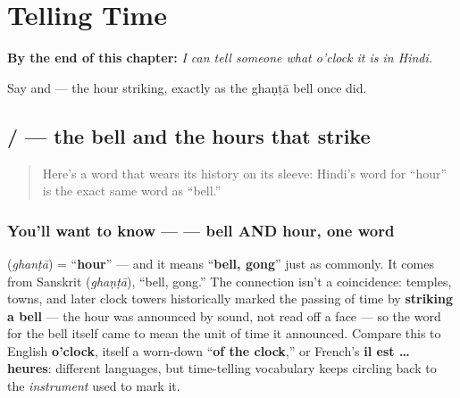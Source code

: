 
\chapter{Telling Time}
\label{ch:hi-telling-time}

\begin{chapteropening}
\textbf{By the end of this chapter:} \emph{I can tell someone what o'clock it is in Hindi.}

Say     and     — the hour striking, exactly as the ghaṇṭā bell once did.
\end{chapteropening}

\section[\texorpdfstring{\hi{घंटा} / \hi{बजना} / \hi{बज} … (ghaṇṭā / bajnā …)}{घंटा / बजना / बज … (ghaṇṭā / bajnā …)}]{ /  — the bell and the hours that strike}

\label{lesson:HI-C18-ghanta}



\begin{quote}
Here's a word that wears its history on its sleeve: Hindi's word for \textquotedblleft{}hour\textquotedblright{} is the exact same word as \textquotedblleft{}bell.\textquotedblright{}
\end{quote}

\subsection*{You'll want to know —  — bell AND hour, one word}
\textbf{} (\emph{ghanṭā}) = \textquotedblleft{}\textbf{hour}\textquotedblright{} — and it means \textquotedblleft{}\textbf{bell, gong}\textquotedblright{} just as commonly. It comes from Sanskrit \textbf{} (\emph{ghaṇṭā}), \textquotedblleft{}bell, gong.\textquotedblright{} The connection isn't a coincidence: temples, towns, and later clock towers historically marked the passing of time by \textbf{striking a bell} — the hour was announced by sound, not read off a face — so the word for the bell itself came to mean the unit of time it announced. Compare this to English \textbf{o'clock}, itself a worn-down \textquotedblleft{}\textbf{of the clock},\textquotedblright{} or French's \textbf{il est … heures}: different languages, but time-telling vocabulary keeps circling back to the \emph{instrument} used to mark it.

